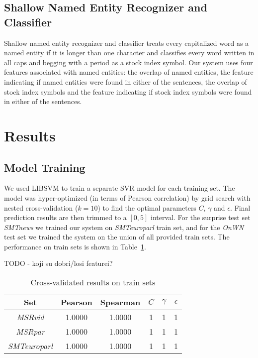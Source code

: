 \documentclass[10pt, a4paper]{article}
\begin{document}
\subsection{Shallow Named Entity Recognizer and Classifier}
Shallow named entity recognizer and classifier treats every capitalized word as a named entity if it is longer than one character and classifies every word written in all caps and begging with a period as a stock index symbol. Our system uses four features associated with named entities: the overlap of named entities, the feature indicating if named entities were found in either of the sentences, the overlap of stock index symbols and the feature indicating if stock index symbols were found in either of the sentences.

\section{Results}

\subsection{Model Training}

We used LIBSVM \citep{chang2011libsvm} to train a separate SVR model for each training set. The model was hyper-optimized (in terms of Pearson correlation) by grid search with nested cross-validation ($k=10$) to find the optimal parameters $C$, $\gamma$ and $\epsilon$. Final prediction results are then trimmed to a $[0,5]$ interval. For the surprise test set \textit{SMTnews} we trained our system on \textit{SMTeuroparl} train set, and for the \textit{OnWN} test set we trained the system on the union of all provided train sets. The performance on train sets is shown in Table~\ref{tab:train-results-table}.

TODO - koji su dobri/losi featurei?

\begin{table}[h]
\caption{Cross-validated results on train sets}
\label{tab:train-results-table}
\begin{center}
\begin{tabular}{cccccc}
\toprule
Set & Pearson & Spearman & $C$ & $\gamma$ & $\epsilon$ \\
\midrule
\textit{MSRvid} & 1.0000 & 1.0000 & 1 & 1 & 1 \\
\textit{MSRpar} & 1.0000 & 1.0000 & 1 & 1 & 1 \\
\textit{SMTeuroparl} & 1.0000 & 1.0000 & 1 & 1 & 1 \\
\bottomrule
\end{tabular}
\end{center}
\end{table}
\end{document}
